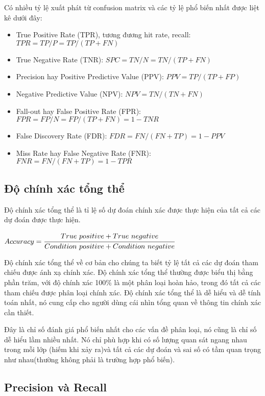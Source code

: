 Có nhiều tỷ lệ xuất phát từ confusion matrix và các tỷ lệ phổ biến nhất được liệt kê dưới đây:

\begin{itemize}
    \item True Positive Rate (TPR), tương đương hit rate, recall: $TPR = TP/P = TP/(TP + FN)$
    \item True Negative Rate (TNR): $SPC = TN/N = TN/(TP + FN)$
    \item Precision hay Positive Predictive Value (PPV): $PPV = TP/(TP + FP)$
    \item Negative Predictive Value (NPV): $NPV = TN/(TN + FN)$
    \item Fall-out hay False Positive Rate (FPR): $FPR = FP/N = FP/(TP + FN) = 1 - TNR$
    \item False Discovery Rate (FDR): $FDR = FN/(FN + TP) = 1 - PPV$
    \item Miss Rate hay False Negative Rate (FNR): $FNR = FN/(FN + TP) = 1 - TPR$
\end{itemize}

\subsection{Độ chính xác tổng thể}

Độ chính xác tổng thể là tỉ lệ số dự đoán chính xác được thực hiện của tất cả các dự đoán được thực hiện.

\begin{center}
    ${Accuracy} =  \cfrac{True\ positive + True\ negative}{Condition\ positive + Condition\ negative}$
\end{center}
Độ chính xác tổng thể về cơ bản cho chúng ta biết tỷ lệ tất cả các dự đoán tham chiếu được ánh xạ chính xác.
Độ chính xác tổng thể thường được biểu thị bằng phần trăm, với độ chính xác 100\% là một phân loại hoàn hảo, trong đó tất cả các tham chiếu được phân loại chính xác.
Độ chính xác tổng thể là dễ hiểu và dễ tính toán nhất, nó cung cấp cho người dùng cái nhìn tổng quan về thông tin chính xác cần thiết.

Đây là chỉ số đánh giá phổ biến nhất cho các vấn đề phân loại, nó cũng là chỉ số dễ hiểu lầm nhiều nhất.
Nó chỉ phù hợp khi có số lượng quan sát ngang nhau trong mỗi lớp (hiếm khi xảy ra)và tất cả các dự đoán và sai số có tầm quan trọng như nhau(thường không phải là trường hợp phổ biến).

\subsection{Precision và Recall}

